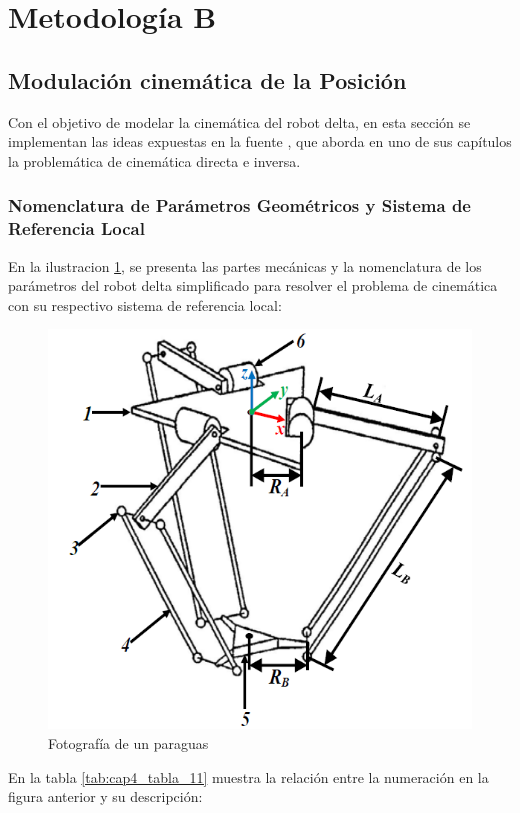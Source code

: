     \newpage

\section{Metodología B}

    \subsection{Modulación cinemática de la Posición}\label{MB_MP}
    
            Con el objetivo de modelar la cinemática del robot delta, en esta sección se implementan las ideas expuestas en la fuente \cite{Path_Planning_and_Trajectory_Optimization}, que aborda en uno de sus capítulos la problemática de cinemática directa e inversa.
    
        \subsubsection{Nomenclatura de Parámetros Geométricos y Sistema de Referencia Local}

            En la ilustracion \ref{f:Cap4_Metodo_B_Modelacion_Cinematica_Posicion_1}, se presenta las partes mecánicas y la nomenclatura de los parámetros del robot delta simplificado para resolver el problema de cinemática con su respectivo sistema de referencia local:

            \begin{figure}[htb]
                 \centering
                 \includegraphics[width=0.5\linewidth]{Main/Chapter4/Images4/Metodo_B_Modelacion_Cinematica_Posicion_1.png}
                  \caption{Fotografía de un paraguas}
                  \label{f:Cap4_Metodo_B_Modelacion_Cinematica_Posicion_1}
            \end{figure}        
        
        
        En la tabla \ref{tab:cap4_tabla_11} muestra la relación entre la numeración en la figura anterior y su descripción:
        
